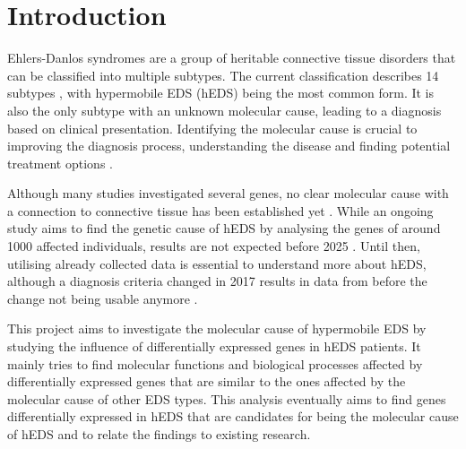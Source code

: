\section{Introduction}


Ehlers-Danlos syndromes are a group of heritable connective tissue disorders that can be classified into multiple subtypes. The current classification describes 14 subtypes \cite{classification2017, Malfait2020}, with hypermobile EDS (hEDS) being the most common form. It is also the only subtype with an unknown molecular cause, leading to a diagnosis based on clinical presentation. Identifying the molecular cause is crucial to improving the diagnosis process, understanding the disease and finding potential treatment options \cite{Ritelli2020}.

Although many studies investigated several genes, no clear molecular cause with a connection to connective tissue has been established yet \cite{Caliogna2021}. While an ongoing study aims to find the genetic cause of hEDS by analysing the genes of around 1000 affected individuals, results are not expected before 2025 \cite{HEDGE}. Until then, utilising already collected data is essential to understand more about hEDS, although a diagnosis criteria changed in 2017 results in data from before the change not being usable anymore \cite{Gensemer2021, Ritelli2022}.
%
%

This project aims to investigate the molecular cause of hypermobile EDS by studying the influence of differentially expressed genes in hEDS patients. It mainly tries to find molecular functions and biological processes affected by differentially expressed genes that are similar to the ones affected by the molecular cause of other EDS types. This analysis eventually aims to find genes differentially expressed in hEDS that are candidates for being the molecular cause of hEDS and to relate the findings to existing research.